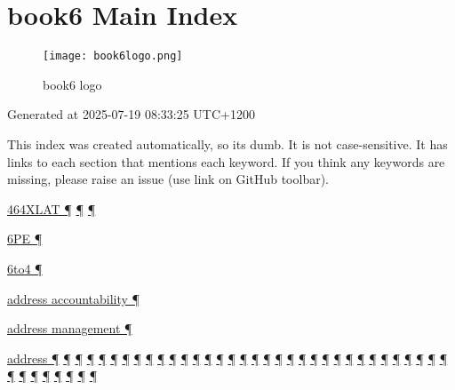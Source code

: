 \documentclass[
]{article}
\begin{document}
\pagebreak

\section{book6 Main Index}\label{book6-main-index}

\begin{figure}
\centering
\texttt{[image: book6logo.png]}
\caption{book6 logo}
\end{figure}

Generated at 2025-07-19 08:33:25 UTC+1200

This index was created automatically, so it\textquotesingle s dumb. It
is not case-sensitive. It has links to each section that mentions each
keyword. If you think any keywords are missing, please raise an issue
(use link on GitHub toolbar).

\hyperref[dual-stack-scenarios]{464XLAT ¶}
\hyperref[translation-and-ipv4-as-a-service]{¶}
\hyperref[deployment-by-carriers]{¶}

\hyperref[tunnels]{6PE ¶}

\hyperref[obsolete-techniques]{6to4 ¶}

\hyperref[address-and-prefix-management]{address accountability ¶}

\hyperref[address-and-prefix-management]{address management ¶}

\hyperref[how-a-user-sees-ipv6]{address ¶}
\hyperref[how-an-application-programmer-sees-ipv6]{¶}
\hyperref[why-version-6]{¶} \hyperref[ipv6-basic-technology]{¶}
\hyperref[address-resolution]{¶} \hyperref[addresses]{¶}
\hyperref[auto-configuration]{¶} \hyperref[dns]{¶}
\hyperref[layer-2-functions]{¶} \hyperref[managed-configuration]{¶}
\hyperref[packet-format]{¶} \hyperref[routing]{¶}
\hyperref[source-and-destination-address-selection]{¶}
\hyperref[coexistence-with-legacy-ipv4]{¶}
\hyperref[dual-stack-scenarios]{¶}
\hyperref[ipv6-primary-differences-from-ipv4]{¶}
\hyperref[obsolete-techniques]{¶}
\hyperref[translation-and-ipv4-as-a-service]{¶} \hyperref[tunnels]{¶}
\hyperref[security]{¶} \hyperref[filtering]{¶}
\hyperref[layer-2-considerations]{¶} \hyperref[topology-obfuscation]{¶}
\hyperref[network-design]{¶} \hyperref[address-planning]{¶}
\hyperref[prefix-per-host]{¶}
\hyperref[address-and-prefix-management]{¶}
\hyperref[basic-windows-commands]{¶} \hyperref[energy-consumption]{¶}
\hyperref[multi-prefix-operation]{¶} \hyperref[multihoming]{¶}
\hyperref[routing-operation]{¶} \hyperref[security-operation]{¶}
\hyperref[cern-and-the-lhc]{¶} \hyperref[deployment-by-carriers]{¶}
\hyperref[deployment-in-the-enterprise]{¶}
\hyperref[deployment-in-the-home]{¶} \hyperref[troubleshooting]{¶}
\hyperref[advanced-troubleshooting]{¶} \hyperref[tools]{¶}
\hyperref[obsolete-features-in-ipv6]{¶} \hyperref[markdown-usage]{¶}
\end{document}
